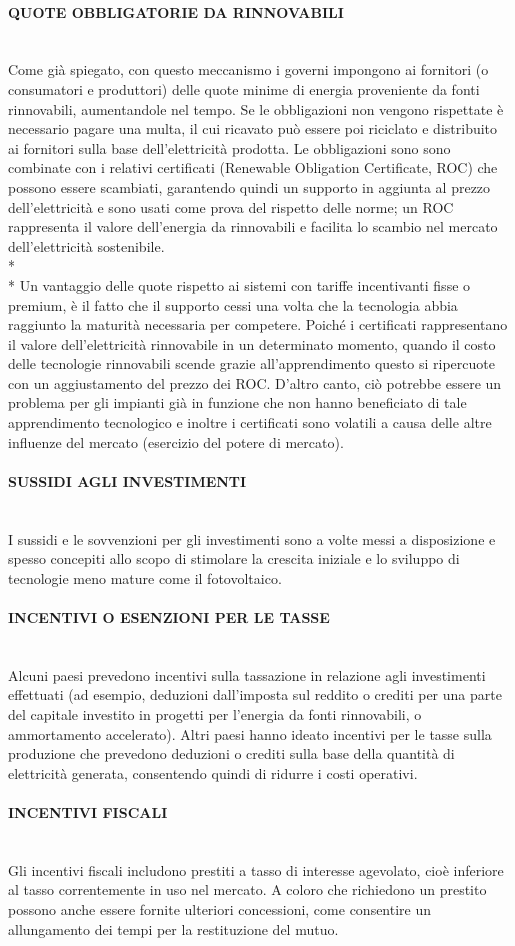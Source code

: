\documentclass[12pt,a4paper,openright,twoside]{report}
\newcommand{\myparagraph}[1]{\paragraph{#1}\mbox{}\\}
\begin{document}
\myparagraph{QUOTE OBBLIGATORIE DA RINNOVABILI}
Come già spiegato, con questo meccanismo i governi impongono ai fornitori (o consumatori e produttori) delle quote minime di energia proveniente da fonti rinnovabili, aumentandole nel tempo. Se le obbligazioni non vengono rispettate è necessario pagare una multa, il cui ricavato può essere poi riciclato e distribuito ai fornitori sulla base dell'elettricità prodotta. Le obbligazioni sono sono combinate con i relativi certificati (Renewable Obligation Certificate, ROC) che possono essere scambiati, garantendo quindi un supporto in aggiunta al prezzo dell'elettricità e sono usati come prova del rispetto delle norme; un ROC rappresenta il valore dell'energia da rinnovabili  e facilita lo scambio nel mercato dell'elettricità sostenibile.\\*\\*
Un vantaggio delle quote rispetto ai sistemi con tariffe incentivanti fisse o premium, è il fatto che il supporto cessi una volta che la tecnologia abbia raggiunto la maturità necessaria per competere. Poiché i certificati rappresentano il valore dell'elettricità rinnovabile in un determinato momento, quando il costo delle tecnologie rinnovabili scende grazie all'apprendimento questo si ripercuote con un aggiustamento del prezzo dei ROC. D'altro canto, ciò potrebbe essere un problema per gli impianti già in funzione che non hanno beneficiato di tale apprendimento tecnologico e inoltre i certificati sono volatili a causa delle altre influenze del mercato (esercizio del potere di mercato).     

\myparagraph{SUSSIDI AGLI INVESTIMENTI}
I sussidi e le sovvenzioni per gli investimenti sono a volte messi a disposizione e spesso concepiti allo scopo di stimolare la crescita iniziale e lo sviluppo di tecnologie meno mature come il fotovoltaico.

\myparagraph{INCENTIVI O ESENZIONI PER LE TASSE}
Alcuni paesi prevedono incentivi sulla tassazione in relazione agli investimenti effettuati (ad esempio, deduzioni dall'imposta sul reddito o crediti per una parte del capitale investito in progetti per l'energia da fonti rinnovabili, o ammortamento accelerato). Altri paesi hanno ideato incentivi per le tasse sulla produzione che prevedono deduzioni o crediti sulla base della quantità di elettricità generata, consentendo quindi di ridurre i costi operativi.

\myparagraph{INCENTIVI FISCALI}
Gli incentivi fiscali includono prestiti a tasso di interesse agevolato, cioè inferiore al tasso correntemente in uso nel mercato. A coloro che richiedono un prestito possono anche essere fornite ulteriori concessioni, come consentire un allungamento dei tempi per la restituzione del mutuo.
\end{document}
